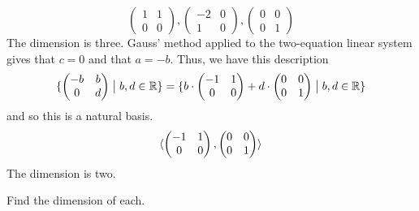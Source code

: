 \begin{exercises}
\begin{answer}
\begin{exparts}
\begin{equation*}
{\begin{pmatrix}
              1  &1  \\
              0  &0
            \end{pmatrix},
            \begin{pmatrix}
              -2  &0  \\
               1  &0
            \end{pmatrix},
            \begin{pmatrix}
              0  &0  \\
              0  &1
            \end{pmatrix}  }
        \end{equation*}
        The dimension is three. 
      \partsitem Gauss' method applied to the two-equation linear system gives
        that $c=0$ and that $a=-b$.
        Thus, we have this description
        \begin{equation*}
         \mbox{$\{\begin{pmatrix}
               -b  &b  \\
                0  &d
             \end{pmatrix} \bigm| b,d\in\mathbb{R}\}$}
         =\mbox{$\{b\cdot\begin{pmatrix}
             -1  &1  \\
             0  &0
           \end{pmatrix}
           +d\cdot\begin{pmatrix}
             0  &0  \\
             0  &1
           \end{pmatrix} \bigm| b,d\in\mathbb{R}\}$}
        \end{equation*}
        and so this is a natural basis.
        \begin{equation*}
          \langle
            \begin{pmatrix}
              -1  &1  \\
               0  &0
            \end{pmatrix},
            \begin{pmatrix}
              0  &0  \\
              0  &1
            \end{pmatrix}  \rangle
        \end{equation*}
        The dimension is two. 
     \end{exparts} 
    \end{answer}
  \recommended \item 
    Find the dimension of each.
    \begin{exparts}

\end{exparts}
\end{exercises}

